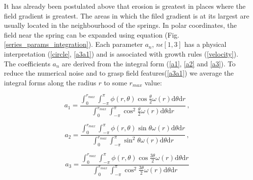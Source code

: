 \documentclass[]{pracamgr}
\begin{document}
      It has already been postulated above that erosion is greatest in places where the field gradient is greatest. The areas in which the filed gradient is at its largest are usually located in the neighbourhood of the springs. In polar coordinates, the field near the spring can be expanded using equation (Fig. \ref{series_params_integration}). Each parameter $a_n$, $n \epsilon [1, 3]$ has a physical interpretation (\ref{circle}, \ref{a3a1}) and is associated with growth rules (\ref{velocity}). The coefficients $a_n$ are derived from the integral form (\ref{a1}, \ref{a2} and \ref{a3}). To reduce the numerical noise and to grasp field features(\ref{a3a1}) we average the integral forms along the radius $r$ to some $r_{max}$ value:
      
      \begin{equation}
        \label{a1_num}
        a_1 = \frac{\int^{r_{max}}_{0} \int^{\pi}_{-\pi} \phi(r, \theta) \cos \frac{\theta}{2} \omega(r) \textrm{d} \theta \textrm{d} r}{\int^{r_{max}}_{0} \int^{\pi}_{-\pi} \cos^2 \frac{\theta}{2} \omega(r) \textrm{d} \theta \textrm{d} r} \,,
      \end{equation} 
      
      \begin{equation}
        \label{a2_num}
        a_2 = \frac{\int^{r_{max}}_{0} \int^{\pi}_{-\pi} \phi(r, \theta) \sin \theta \omega(r) \textrm{d} \theta \textrm{d} r}{\int^{r_{max}}_{0} \int^{\pi}_{-\pi} \sin^2 \theta \omega(r) \textrm{d} \theta \textrm{d} r} \,,
      \end{equation}
      
      \begin{equation}
        \label{a3_num}
        a_3 = \frac{\int^{r_{max}}_{0} \int^{\pi}_{-\pi} \phi(r, \theta) \cos \frac{3 \theta}{2} \omega(r) \textrm{d} \theta \textrm{d} r}{\int^{r_{max}}_{0} \int^{\pi}_{-\pi} \cos^2 \frac{3 \theta}{2} \omega(r) \textrm{d} \theta \textrm{d} r}
      \end{equation}	
\end{document}
